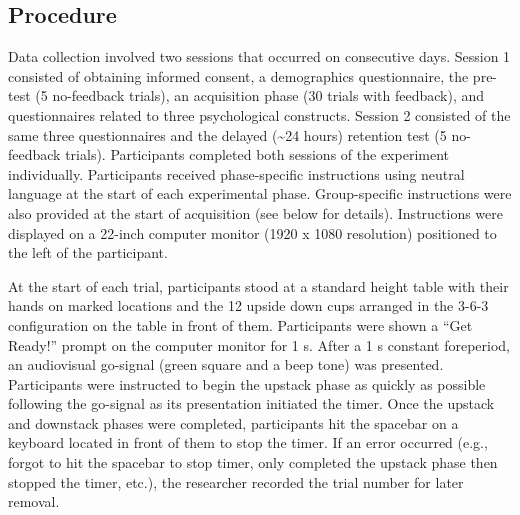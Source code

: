 \documentclass[
  man, donotrepeattitle,mask,floatsintext]{apa7}
\begin{document}
\hypertarget{procedure}{%
\subsection{Procedure}\label{procedure}}

Data collection involved two sessions that occurred on consecutive days. Session 1 consisted of obtaining informed consent, a demographics questionnaire, the pre-test (5 no-feedback trials), an acquisition phase (30 trials with feedback), and questionnaires related to three psychological constructs. Session 2 consisted of the same three questionnaires and the delayed (\textasciitilde24 hours) retention test (5 no-feedback trials). Participants completed both sessions of the experiment individually. Participants received phase-specific instructions using neutral language at the start of each experimental phase. Group-specific instructions were also provided at the start of acquisition (see below for details). Instructions were displayed on a 22-inch computer monitor (1920 x 1080 resolution) positioned to the left of the participant.

At the start of each trial, participants stood at a standard height table with their hands on marked locations and the 12 upside down cups arranged in the 3-6-3 configuration on the table in front of them. Participants were shown a ``Get Ready!'' prompt on the computer monitor for 1 s. After a 1 s constant foreperiod, an audiovisual go-signal (green square and a beep tone) was presented. Participants were instructed to begin the upstack phase as quickly as possible following the go-signal as its presentation initiated the timer. Once the upstack and downstack phases were completed, participants hit the spacebar on a keyboard located in front of them to stop the timer. If an error occurred (e.g., forgot to hit the spacebar to stop timer, only completed the upstack phase then stopped the timer, etc.), the researcher recorded the trial number for later removal.

\begin{table}

\caption{\label{tab:table1}Cronbach's alpha for each questionnaire at each timepoint.}
\end{table}
\end{document}
